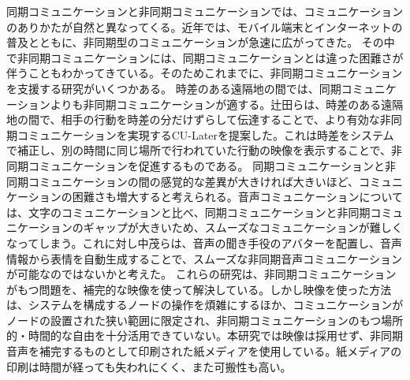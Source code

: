 \documentclass[submit,techrep,noauthor]{ipsj}
\def\|{\verb|}
\begin{document}
% \begin{enumerate}
% \item \|ipsj.cls      |: 最終原稿用スタイルファイル

同期コミュニケーションと非同期コミュニケーションでは、コミュニケーションのありかたが自然と異なってくる。近年では、モバイル端末とインターネットの普及とともに、非同期型のコミュニケーションが急速に広がってきた。
その中で非同期コミュニケーションには、同期コミュニケーションとは違った困難さが伴うこともわかってきている。そのためこれまでに、非同期コミュニケーションを支援する研究がいくつかある。
時差のある遠隔地の間では、同期コミュニケーションよりも非同期コミュニケーションが適する。辻田らは、時差のある遠隔地の間で、相手の行動を時差の分だけずらして伝達することで、より有効な非同期コミュニケーションを実現するCU-Laterを提案した。これは時差をシステムで補正し、別の時間に同じ場所で行われていた行動の映像を表示することで、非同期コミュニケーションを促進するものである。
同期コミュニケーションと非同期コミュニケーションの間の感覚的な差異が大きければ大きいほど、コミュニケーションの困難さも増大すると考えられる。音声コミュニケーションについては、文字のコミュニケーションと比べ、同期コミュニケーションと非同期コミュニケーションのギャップが大きいため、スムーズなコミュニケーションが難しくなってしまう。これに対し中茂らは、音声の聞き手役のアバターを配置し、音声情報から表情を自動生成することで、スムーズな非同期音声コミュニケーションが可能なのではないかと考えた。
これらの研究は、非同期コミュニケーションがもつ問題を、補完的な映像を使って解決している。しかし映像を使った方法は、システムを構成するノードの操作を煩雑にするほか、コミュニケーションがノードの設置された狭い範囲に限定され、非同期コミュニケーションのもつ場所的・時間的な自由を十分活用できていない。本研究では映像は採用せず、非同期音声を補完するものとして印刷された紙メディアを使用している。紙メディアの印刷は時間が経っても失われにくく、また可搬性も高い。
\end{document}

